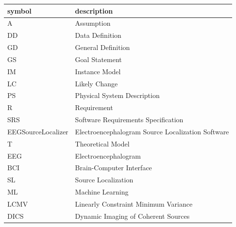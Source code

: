 \documentclass[12pt]{article}
\begin{document}
\renewcommand{\arraystretch}{1.2}
\begin{tabular}{l l} 
  \toprule		
  \textbf{symbol} & \textbf{description}\\
  \midrule 
  A & Assumption\\
  DD & Data Definition\\
  GD & General Definition\\
  GS & Goal Statement\\
  IM & Instance Model\\
  LC & Likely Change\\
  PS & Physical System Description\\
  R & Requirement\\
  SRS & Software Requirements Specification\\
 EEGSourceLocalizer & Electroencephalogram Source Localization Software\\ %
  T & Theoretical Model\\
  EEG & Electroencephalogram \\
  BCI & Brain-Computer Interface\\
  SL & Source Localization \\
  ML & Machine Learning \\
  LCMV & Linearly Constraint Minimum Variance \\
  DICS & Dynamic Imaging of Coherent Sources\\

  \bottomrule
\end{tabular}\\



\end{document}
